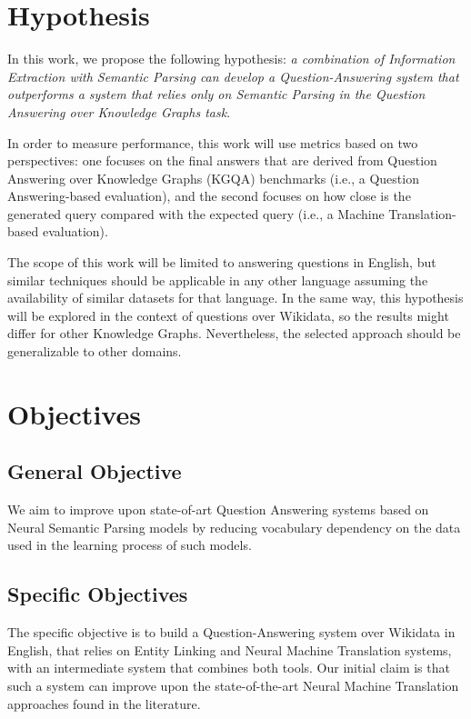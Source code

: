 \section{Hypothesis}
In this work, we propose the following hypothesis: \textit{a combination of Information 
Extraction with Semantic Parsing can develop a Question-Answering system that outperforms 
a system that relies only on Semantic Parsing in the Question Answering over Knowledge 
Graphs task}.

In order to measure performance, this work will use metrics based on two perspectives: 
one focuses on the final answers that are derived from Question Answering over Knowledge 
Graphs (KGQA) benchmarks (i.e., a Question Answering-based evaluation), and the second 
focuses on how close is the generated \SPARQL{} query compared with the expected query (i.e., 
a Machine Translation-based evaluation).

The scope of this work will be limited to answering questions in English, but similar 
techniques should be applicable in any other language assuming the availability of similar 
datasets for that language. In the same way, this hypothesis will be explored in the context of 
questions over Wikidata, so the results might differ for other Knowledge Graphs. Nevertheless, 
the selected approach should be generalizable to other domains. 

\section{Objectives}
\subsection*{General Objective}
We aim to improve upon state-of-art Question Answering systems 
based on Neural Semantic Parsing models by reducing vocabulary dependency on the 
data used in the learning process of such models.
\subsection*{Specific Objectives}
The specific objective is to build a Question-Answering system over Wikidata in English, 
that relies on Entity Linking and Neural Machine Translation systems, with an intermediate 
system that combines both tools. Our initial claim is that such a system can improve upon 
the state-of-the-art Neural Machine Translation approaches found in the literature.  

